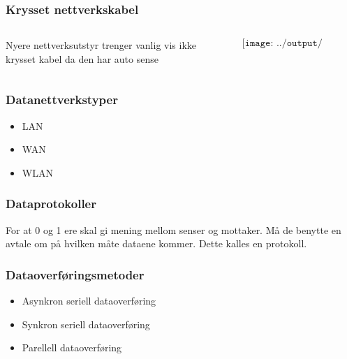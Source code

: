 \documentclass[aspectratio=169,xcolor=dvipsnames]{beamer}
\begin{document}
\begin{frame}
	\frametitle{Krysset nettverkskabel}
	\begin{columns}
		\begin{column}{0.5\textwidth}

Nyere nettverksutstyr trenger vanlig vis ikke krysset kabel da den har auto sense
			
		\end{column}

		\begin{column}{0.5\textwidth}
	$$\texttt{[image: ../output/noGPLimages/kap5x07]}$$
		\end{column}
	\end{columns}
\end{frame}
\begin{frame}
	\frametitle{Datanettverkstyper}
	\begin{itemize}
		\item LAN
		\item WAN
		\item WLAN
	\end{itemize}

	
\end{frame}
\begin{frame}
	\frametitle{Dataprotokoller}

For at 0 og 1 ere skal gi mening mellom senser og mottaker. Må de benytte en avtale om på hvilken måte dataene kommer. Dette kalles en protokoll. 
	
\end{frame}
\begin{frame}
	\frametitle{Dataoverføringsmetoder}
	\begin{itemize}
		\item Asynkron seriell dataoverføring
		\item Synkron seriell dataoverføring
		\item Parellell dataoverføring
	\end{itemize}
\end{frame}
\end{document}
